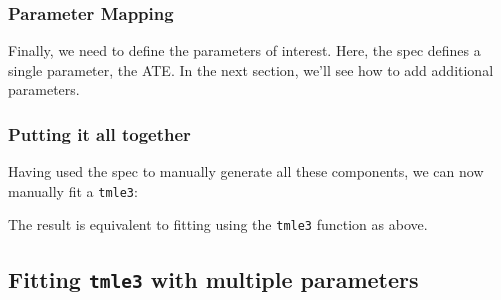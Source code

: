 \documentclass[12pt, krantz2,]{krantz}
\newenvironment{Shaded}{\begin{snugshade}}{\end{snugshade}}
\newcommand{\CommentTok}[1]{\textcolor[rgb]{0.37,0.37,0.37}{\textit{#1}}}
\newcommand{\KeywordTok}[1]{\textcolor[rgb]{0.27,0.27,0.27}{\textbf{#1}}}
\newcommand{\NormalTok}[1]{#1}
\newcommand{\OperatorTok}[1]{\textcolor[rgb]{0.43,0.43,0.43}{\textbf{#1}}}
\newcommand{\StringTok}[1]{\textcolor[rgb]{0.5,0.5,0.5}{#1}}
\theoremstyle{definition}
\theoremstyle{definition}
\theoremstyle{definition}
\newcommand{\1}{\mathbbm{1}}
\begin{document}
\hypertarget{parameter-mapping}{%
\subsubsection{Parameter Mapping}\label{parameter-mapping}}

Finally, we need to define the parameters of interest. Here, the spec defines a
single parameter, the ATE. In the next section, we'll see how to add additional
parameters.

\begin{Shaded}
\end{Shaded}

\hypertarget{putting-it-all-together}{%
\subsubsection{Putting it all together}\label{putting-it-all-together}}

Having used the spec to manually generate all these components, we can now
manually fit a \texttt{tmle3}:

\begin{Shaded}
\end{Shaded}

The result is equivalent to fitting using the \texttt{tmle3} function as above.

\hypertarget{fitting-tmle3-with-multiple-parameters}{%
\subsection{\texorpdfstring{Fitting \texttt{tmle3} with multiple parameters}{Fitting tmle3 with multiple parameters}}\label{fitting-tmle3-with-multiple-parameters}}
\end{document}
